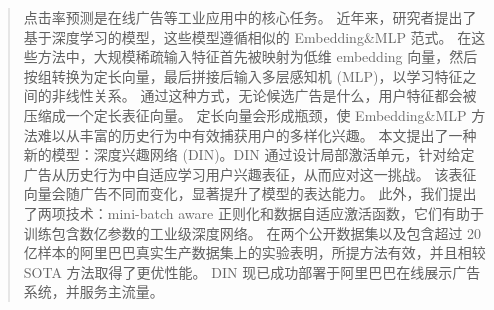 \documentclass[sigconf]{acmart}
\begin{document}
\begin{abstract}
点击率预测是在线广告等工业应用中的核心任务。
近年来，研究者提出了基于深度学习的模型，这些模型遵循相似的 Embedding\&MLP 范式。
在这些方法中，大规模稀疏输入特征首先被映射为低维 embedding 向量，然后按组转换为定长向量，最后拼接后输入多层感知机 (MLP)，以学习特征之间的非线性关系。
通过这种方式，无论候选广告是什么，用户特征都会被压缩成一个定长表征向量。
定长向量会形成瓶颈，使 Embedding\&MLP 方法难以从丰富的历史行为中有效捕获用户的多样化兴趣。
本文提出了一种新的模型：深度兴趣网络 (DIN)。DIN 通过设计局部激活单元，针对给定广告从历史行为中自适应学习用户兴趣表征，从而应对这一挑战。
该表征向量会随广告不同而变化，显著提升了模型的表达能力。
此外，我们提出了两项技术：mini-batch aware 正则化和数据自适应激活函数，它们有助于训练包含数亿参数的工业级深度网络。
在两个公开数据集以及包含超过 20 亿样本的阿里巴巴真实生产数据集上的实验表明，所提方法有效，并且相较 SOTA 方法取得了更优性能。
DIN 现已成功部署于阿里巴巴在线展示广告系统，并服务主流量。



\end{abstract}
\end{document}
